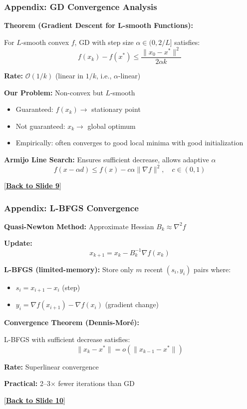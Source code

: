 \documentclass[aspectratio=169,usenames,dvipsnames]{beamer}
\begin{document}
\begin{frame}[label=app:gd_convergence]
\frametitle{Appendix: GD Convergence Analysis}

\textbf{Theorem (Gradient Descent for L-smooth Functions):}

For $L$-smooth convex $f$, GD with step size $\alpha \in (0, 2/L]$ satisfies:
\[
f(x_k) - f(x^*) \leq \frac{\|x_0 - x^*\|^2}{2\alpha k}
\]

\textbf{Rate:} $\mathcal{O}(1/k)$ (linear in $1/k$, i.e., $\alpha$-linear)

\vspace{0.3cm}

\textbf{Our Problem:} Non-convex but $L$-smooth
\begin{itemize}
  \item Guaranteed: $f(x_k) \to$ stationary point
  \item Not guaranteed: $x_k \to$ global optimum
  \item Empirically: often converges to good local minima with good initialization
\end{itemize}

\vspace{0.3cm}

\textbf{Armijo Line Search:} Ensures sufficient decrease, allows adaptive $\alpha$
\[
f(x - \alpha d) \leq f(x) - c \alpha \|\nabla f\|^2, \quad c \in (0, 1)
\]

\hyperlink{9}{[\textbf{Back to Slide 9}]}

\end{frame}

\begin{frame}[label=app:lbfgs_convergence]
\frametitle{Appendix: L-BFGS Convergence}

\textbf{Quasi-Newton Method:} Approximate Hessian $B_k \approx \nabla^2 f$

\vspace{0.3cm}

\textbf{Update:}
\[
x_{k+1} = x_k - B_k^{-1} \nabla f(x_k)
\]

\vspace{0.3cm}

\textbf{L-BFGS (limited-memory):} Store only $m$ recent $(s_i, y_i)$ pairs where:
\begin{itemize}
  \item $s_i = x_{i+1} - x_i$ (step)
  \item $y_i = \nabla f(x_{i+1}) - \nabla f(x_i)$ (gradient change)
\end{itemize}

\vspace{0.3cm}

\textbf{Convergence Theorem (Dennis-Moré):}

L-BFGS with sufficient decrease satisfies:
\[
\|x_k - x^*\| = o(\|x_{k-1} - x^*\|)
\]

\textbf{Rate:} Superlinear convergence

\vspace{0.3cm}

\textbf{Practical:} 2--3$\times$ fewer iterations than GD

\hyperlink{10}{[\textbf{Back to Slide 10}]}

\end{frame}
\end{document}
